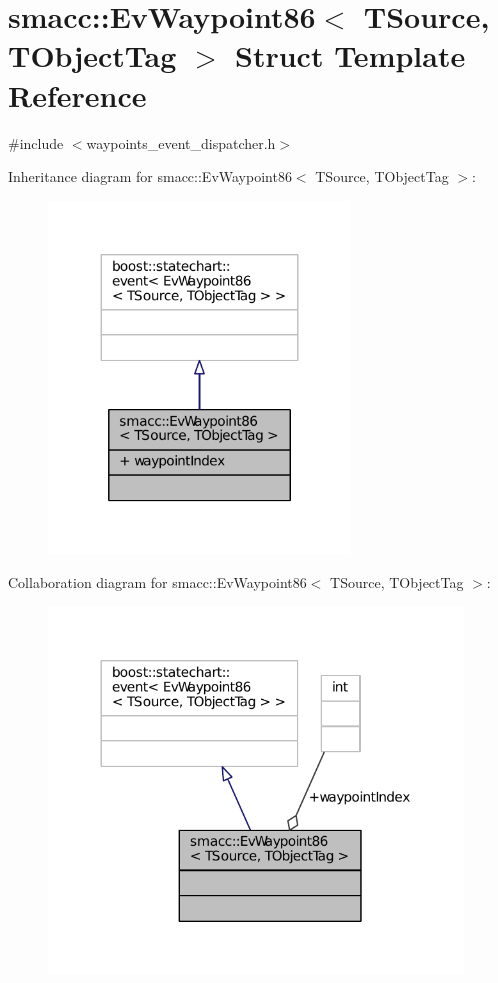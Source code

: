 \hypertarget{structsmacc_1_1EvWaypoint86}{}\section{smacc\+:\+:Ev\+Waypoint86$<$ T\+Source, T\+Object\+Tag $>$ Struct Template Reference}
\label{structsmacc_1_1EvWaypoint86}


{\ttfamily \#include $<$waypoints\+\_\+event\+\_\+dispatcher.\+h$>$}



Inheritance diagram for smacc\+:\+:Ev\+Waypoint86$<$ T\+Source, T\+Object\+Tag $>$\+:
\nopagebreak
\begin{figure}[H]
\begin{center}
\leavevmode
\includegraphics[width=227pt]{structsmacc_1_1EvWaypoint86__inherit__graph}
\end{center}
\end{figure}


Collaboration diagram for smacc\+:\+:Ev\+Waypoint86$<$ T\+Source, T\+Object\+Tag $>$\+:
\nopagebreak
\begin{figure}[H]
\begin{center}
\leavevmode
\includegraphics[width=312pt]{structsmacc_1_1EvWaypoint86__coll__graph}
\end{center}
\end{figure}
